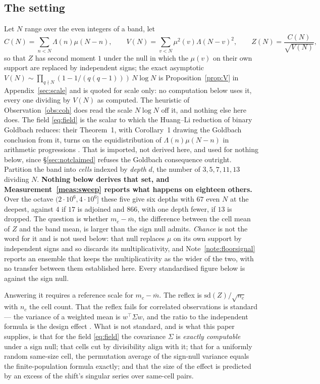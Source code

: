 \documentclass[11pt,a4paper]{article}
\theoremstyle{plain}
\theoremstyle{definition}
\theoremstyle{remark}
\begin{document}
\subsection{The setting}

Let $N$ range over the even integers of a band, let
\begin{equation}\label{eq:field}
  C(N)=\sum_{n<N}\Lambda(n)\mu(N-n),
  \qquad
  V(N)=\sum_{v<N}\mu^2(v)\Lambda(N-v)^2,
  \qquad
  Z(N)=\frac{C(N)}{\sqrt{V(N)}},
\end{equation}
so that $Z$ has second moment $1$ under the null in which the $\mu(v)$
on their own support are replaced by independent signs; the exact
asymptotic $V(N)\sim\prod_{q\nmid N}(1-1/(q(q-1)))\,N\log N$ is
Proposition~\ref{prop:V} in Appendix~\ref{sec:scale} and is quoted for
scale only: no computation below uses it, every one dividing by $V(N)$
as computed. The heuristic of Observation~\ref{obs:coh} does read the
scale $N\log N$ off it, and nothing else here does. The field \eqref{eq:field} is the scalar to
which the Huang--Li reduction of binary Goldbach reduces: their
Theorem~1, with Corollary~1 drawing the Goldbach conclusion from it,
turns on the equidistribution of $\Lambda(n)\mu(N-n)$ in arithmetic
progressions \cite[Thm.~1, Cor.~1]{HL}. That is imported, not derived
here, and used for nothing below, since
\S\ref{sec:notclaimed} refuses the Goldbach consequence outright.
Partition the
band into \emph{cells} indexed by \emph{depth} $d$, the number of
$3,5,7,11,13$ dividing $N$. \textbf{Nothing below derives that set, and
Measurement~\ref{meas:sweep} reports what happens on eighteen others.}
Over the octave $(2\cdot10^6,4\cdot10^6]$ these five give six depths
with $67$ even $N$ at the deepest, against $4$ if $17$ is adjoined and
$866$, with one depth fewer, if $13$ is dropped. The question is whether
$m_c-\overline m$, the difference between the cell mean of $Z$ and the
band mean, is larger than the sign null admits. \emph{Chance} is not
the word for it and is not used below: that null replaces $\mu$ on its
own support by independent signs and so discards its multiplicativity,
and Note~\ref{note:floorsignal} reports an ensemble that keeps the
multiplicativity as the wider of the two, with no transfer between them
established here. Every standardised figure below is against the sign
null.

Answering it requires a reference scale for $m_c-\overline m$. The
reflex is $\mathrm{sd}(Z)/\sqrt{n_c}$ with $n_c$ the cell count. That
the reflex fails for correlated observations is standard --- the
variance of a weighted mean is $w^{\top}\Sigma w$, and the ratio to
the independent formula is the design effect \cite{Kish}. What is not
standard, and is what this paper supplies, is that for the field
\eqref{eq:field} the covariance $\Sigma$ is \emph{exactly computable}
under a sign null; that cells cut by divisibility align with it; that
for a uniformly random same-size cell, the permutation average of the
sign-null variance equals the finite-population formula exactly; and
that the size of the effect is
predicted by an excess of the shift's singular series over same-cell
pairs.
\end{document}
